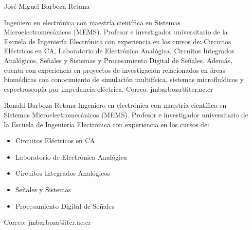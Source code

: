 \documentclass[journal]{IEEEtran}
\begin{document}
\begin{IEEEbiography}{José Miguel Barboza-Retana}

Ingeniero en electrónica con maestría científica en Sistemas Microelectromecánicos (MEMS). Profesor e investigador universitario de la Escuela de Ingeniería Electrónica con experiencia en los cursos de: Circuitos Eléctricos en CA, Laboratorio de Electrónica Analógica, Circuitos Integrados Analógicos, Señales y Sistemas y Procesamiento Digital de Señales. Además, cuenta con experiencia en proyectos de investigación relacionados en áreas biomédicas con conocimiento de simulación multifísica, sistemas microfluídicos y espectroscopía por impedancia eléctrica.
Correo: jmbarboza@itcr.ac.cr

\end{IEEEbiography}
 
\begin{IEEEbiographynophoto}{Ronald Barboza-Retana}
Ingeniero en electrónica con maestría científica en Sistemas Microelectromecánicos (MEMS). Profesor e investigador universitario de la Escuela de Ingeniería Electrónica con experiencia en los cursos de:

\begin{itemize}
\item Circuitos Eléctricos en CA
\item Laboratorio de Electrónica Analógica
\item Circuitos Integrados Analógicos
\item Señales y Sistemas
\item Procesamiento Digital de Señales
\end{itemize} 

Correo: jmbarboza@itcr.ac.cr
\end{IEEEbiographynophoto}

\vfill
\end{document}
